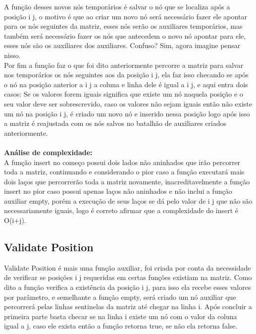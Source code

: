 \documentclass[a4paper,12pt]{article}
\begin{document}
 A função desses novos nós temporários é salvar o nó que se localiza após a posição i j, o motivo é que ao criar um novo nó será necessário fazer ele apontar para os nós seguintes da matriz, esses nós serão os auxiliares temporários, mas também será necessário fazer os nós que antecedem o novo nó apontar para ele, esses nós são os auxiliares dos auxiliares. Confuso? Sim, agora imagine pensar nisso.\\
 Por fim a função faz o que foi dito anteriormente percorre a matriz para salvar nos temporários os nós seguintes aos da posição i j, ela faz isso checando se após o nó na posição anterior a i j a coluna e linha dele é igual a i j, e aqui entra dois casos: Se os valores forem iguais significa que existe um nó naquela posição e o seu valor deve ser sobrescrevido, caso os valores não sejam iguais então não existe um nó na posição i j, é criado um novo nó e inserido nessa posição logo após isso a matriz é reajustada com os nós salvos no batalhão de auxiliares criados anteriormente.\\\\

 \textbf{ Análise de complexidade:}\\
A função insert no começo possui dois lados não aninhados que irão percorrer toda a matriz, continuando e considerando o pior caso a função executará mais dois laços que percorrerão toda a matriz novamente, inacreditavelmente a função insert no pior caso possui apenas laços não aninhados e não inclui a função auxiliar empty, porém a execução de seus laços se dá pelo valor de i j que não são necessariamente iguais, logo é correto afirmar que a complexidade do insert é O(i+j).

\subsection{Validate Position}
Validate Position é mais uma função auxiliar, foi criada por conta da necessidade de verificar se posições i j requeridas em certas funções existiam na matriz.
Como dito a função verifica a existência da posição i j, para isso ela recebe esses valores por parâmetro, e semelhante a função empty, será criado um nó auxiliar que percorrerá pelas linhas sentinelas da matriz até chegar na linha i.
Após concluir a primeira parte basta checar se na linha i existe um nó com o valor da coluna igual a j, caso ele exista então a função retorna true, se não ela retorna false.
\end{document}

